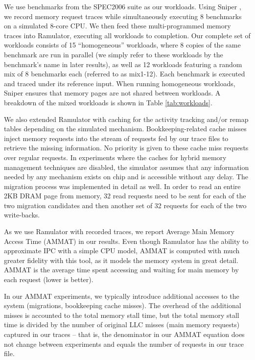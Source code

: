 We use benchmarks from the SPEC2006 suite \cite{spec} as our workloads. Using Sniper \cite{sniper}, we record memory request traces while simultaneously executing 8 benchmarks on a simulated 8-core CPU. We then feed these multi-programmed memory traces into Ramulator, executing all workloads to completion. Our complete set of workloads consists of 15 ``homogeneous'' workloads, where 8 copies of the same benchmark are run in parallel (we simply refer to these workloads by the benchmark's name in later results), as well as 12 workloads featuring a random mix of 8 benchmarks each (referred to as mix1-12). Each benchmark is executed and traced under its reference input. When running homogeneous workloads, Sniper ensures that memory pages are not shared between workloads. A breakdown of the mixed workloads is shown in Table \ref{tab:workloads}.



We also extended Ramulator with caching for the activity tracking and/or remap tables depending on the simulated mechanism. Bookkeeping-related cache misses inject memory requests into the stream of requests fed by our trace files to retrieve the missing information. No priority is given to these cache miss requests over regular requests. In experiments where the caches for hybrid memory management techniques are disabled, the simulator assumes that any information needed by any mechanism exists on chip and is accessible without any delay. The migration process was implemented in detail as well. In order to read an entire 2KB DRAM page from memory, 32 read requests need to be sent for each of the two migration candidates and then another set of 32 requests for each of the two write-backs.

As we use Ramulator with recorded traces, we report Average Main Memory Access Time (AMMAT) in our results. Even though Ramulator has the ability to approximate IPC with a simple CPU model, 
AMMAT is computed with much greater fidelity with this tool, as it models the memory system in great detail. AMMAT is the average time spent accessing and waiting for main memory by each request (lower is better). 

In our AMMAT experiments, we typically introduce additional accesses to the
system (migrations, bookkeeping cache misses).  The overhead of the additional
misses is accounted to the total memory stall time, but the total memory 
stall time is divided by the number of original LLC misses (main memory requests) captured in our traces
-- that is, the denominator in our AMMAT equation does not change between
experiments and equals the number of requests in our trace file.

